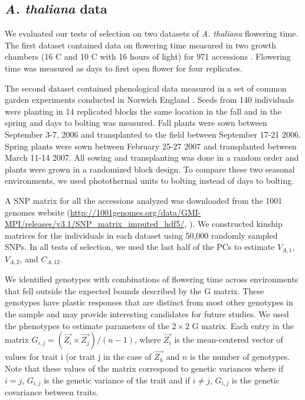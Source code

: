 \documentclass[11pt,letterpaper]{article}
\begin{document}
\subsection*{\textit{A. thaliana} data}
We evaluated our tests of selection on two datasets of \textit{A. thaliana} flowering time.
The first dataset contained data on flowering time measured in two growth chambers (16 \degree C and 10 \degree C with 16 hours of light) for 971 accessions \citep{alonso20161}.
Flowering time was measured as days to first open flower for four replicates.

The second dataset contained phenological data measured in a set of common garden experiments conducted in Norwich England \citep{fournier2011map, wilczek2009effects}. 
Seeds from 140 individuals were planting in 14 replicated blocks the same location in the fall  and in the spring and days to bolting was measured.
Fall plants were sown between September 3-7, 2006 and transplanted to the field between September 17-21 2006.
Spring plants were sown between February 25-27 2007 and transplanted between March 11-14 2007.
All sowing and transplanting was done in a random order and plants were grown in a randomized block design.
To compare these two seasonal environments, we used photothermal units to bolting instead of days to bolting.

A SNP matrix for all the accessions analyzed was downloaded from the 1001 genomes website (\url{http://1001genomes.org/data/GMI-MPI/releases/v3.1/SNP_matrix_imputed_hdf5/}, \cite{alonso20161}). 
We constructed kinship matrices for the individuals in each dataset using 50,000 randomly sampled SNPs.
In all tests of selection, we used the last half of the PCs to estimate $V_{A,1}$, $V_{A,2}$, and $C_{A,12}$.

We identified genotypes with combinations of flowering time across environments that fell outside the expected bounds described by the G matrix.
These genotypes have plastic responses that are distinct from most other genotypes in the sample and may provide interesting candidates for future studies.
We used the phenotypes to estimate parameters of the $2\times 2$ G matrix. 
Each entry in the matrix $G_{i,j} = (\vec{Z_i} \times \vec{Z_j})/(n-1)$, where $\vec{Z_i}$ is the mean-centered vector of values for trait i (or trait j in the case of $\vec{Z_h}$ and $n$ is the number of genotypes. 
Note that these values of the matrix correspond to genetic variances where if $i=j$, $G_{i,j}$ is the genetic variance of the trait and if $i \neq j$, $G_{i,j}$ is the genetic covariance between traits.
\end{document}
